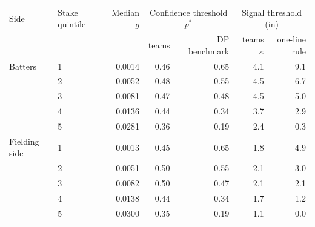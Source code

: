 \begin{tabular}{llrrrrr}
\toprule
Side & Stake quintile & Median $g$ & \multicolumn{2}{c}{Confidence threshold $p^\ast$} & \multicolumn{2}{c}{Signal threshold (in)} \\
 & & & teams & DP benchmark & teams $\kappa$ & one-line rule \\
\midrule
Batters & 1 & 0.0014 & 0.46 & 0.65 & 4.1 & 9.1 \\
 & 2 & 0.0052 & 0.48 & 0.55 & 4.5 & 6.7 \\
 & 3 & 0.0081 & 0.47 & 0.48 & 4.5 & 5.0 \\
 & 4 & 0.0136 & 0.44 & 0.34 & 3.7 & 2.9 \\
 & 5 & 0.0281 & 0.36 & 0.19 & 2.4 & 0.3 \\
\addlinespace
Fielding side & 1 & 0.0013 & 0.45 & 0.65 & 1.8 & 4.9 \\
 & 2 & 0.0051 & 0.50 & 0.55 & 2.1 & 3.0 \\
 & 3 & 0.0082 & 0.50 & 0.47 & 2.1 & 2.1 \\
 & 4 & 0.0138 & 0.44 & 0.34 & 1.7 & 1.2 \\
 & 5 & 0.0300 & 0.35 & 0.19 & 1.1 & 0.0 \\
\bottomrule
\end{tabular}
